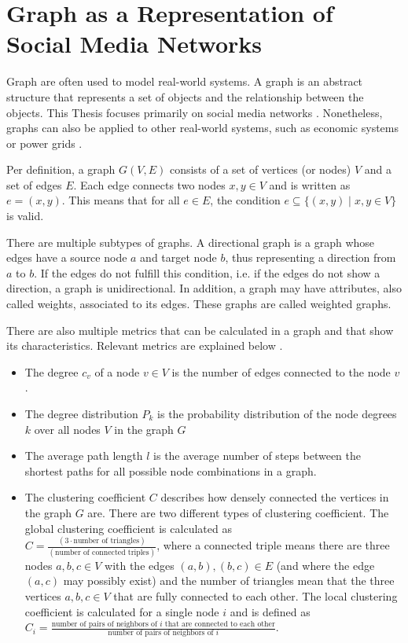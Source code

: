 \section{Graph as a Representation of Social Media Networks}
\label{graphbasics}
Graph are often used to model real-world systems.
A graph is an abstract structure that represents a set of objects and the 
relationship between the objects. 
This Thesis focuses primarily on social media networks
\cite{socialgraphexample}. Nonetheless, graphs can 
also be applied to other real-world systems, such as economic systems 
\cite{economicsgraph} or power grids \cite{powergraphexample}.


Per definition, a graph $G(V, E)$ consists of a set of vertices (or nodes) $V$ and a 
set of edges $E$. Each edge connects two nodes $x, y \in V$ and is 
written as $e=(x, y)$. This means that for all $e\in E$, the 
condition  $e \subseteq\{ (x, y) \mid x, y \in V  \}$ 
is valid.

There are multiple subtypes of graphs. A directional graph is a graph 
whose edges have a source node $a$ and target node $b$, thus representing
a direction from $a$ to $b$. If the edges do not fulfill this 
condition, i.e. if the edges do not show a direction, a graph is unidirectional.
In addition, a graph may have attributes, also called weights, 
associated to its edges. These graphs are called weighted graphs.

There are also multiple metrics that can be calculated in a graph
and that show its characteristics. Relevant metrics are 
explained below \cite{basicnetwork}.
\begin{itemize}
    \item The degree $c_v$ of a node $v \in V$ is the number of edges connected to the
    node $v$. 
    \item The degree distribution $P_k$ is the probability distribution 
    of the node degrees $k$ over all nodes $V$ in the graph $G$
    \item The average path length $l$ is the average number of steps between
    the shortest paths for all possible node combinations in a graph.
    \item The clustering coefficient $C$ describes how densely connected
    the vertices in the graph $G$ are. There are two different types of
    clustering coefficient. The global clustering
    coefficient is calculated as \\
    $C=\frac{(3 \cdot\text{number of triangles})}{(\text{number of connected triples})}$,
    where a connected triple means there are three nodes $a,b,c\in V$ with
    the edges $(a,b), (b,c) \in E$ (and where the edge $(a,c)$ may 
    possibly exist) and the number of triangles mean
    that the three vertices $a,b,c\in V$ that are fully connected to each other.
    The local clustering coefficient is calculated for a single node $i$
    and is defined as $C_i=\frac{\text{number of pairs of neighbors of }i 
    \text{ that are connected to each other}}
    {\text{number of pairs of neighbors of }i }$.
\end{itemize}

